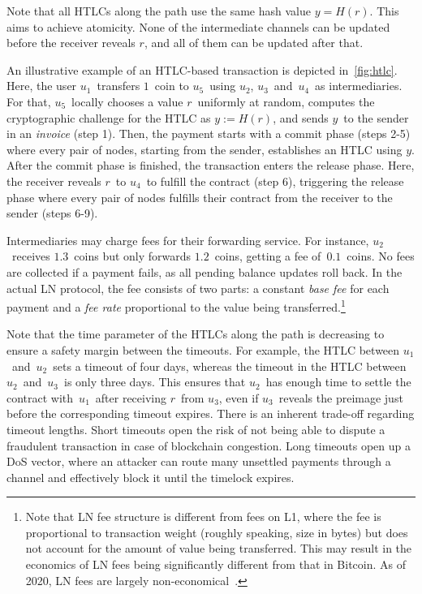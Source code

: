 Note that all HTLCs along the path use the same hash value $y=H(r)$.
This aims to achieve atomicity.
None of the intermediate channels can be updated before the receiver reveals $r$, and all of them can be updated after that.

An illustrative example of an HTLC-based transaction is depicted in~\cref{fig:htlc}.
Here, the user $u_1$~transfers $1$~coin to $u_5$~using $u_2$, $u_3$~and~$u_4$~as intermediaries.
For that, $u_5$~locally chooses a value $r$~uniformly at random, computes the cryptographic challenge for the HTLC as $y := H(r)$, and sends $y$~to the sender in an \textit{invoice} (step 1).
Then, the payment starts with a commit phase (steps 2-5) where every pair of nodes, starting from the sender, establishes an HTLC using $y$.
After the commit phase is finished, the transaction enters the release phase.
Here, the receiver reveals $r$~to $u_4$~to fulfill the contract (step 6), triggering the release phase where every pair of nodes fulfills their contract from the receiver to the sender (steps 6-9).

Intermediaries may charge fees for their forwarding service.
For instance, $u_2$~receives $1.3$~coins but only forwards $1.2$~coins, getting a fee of~$0.1$~coins.
No fees are collected if a payment fails, as all pending balance updates roll back.
In the actual LN protocol, the fee consists of two parts: a constant \textit{base fee} for each payment and a \textit{fee rate} proportional to the value being transferred.\footnote{Note that LN fee structure is different from fees on L1, where the fee is proportional to transaction weight (roughly speaking, size in bytes) but does not account for the amount of value being transferred. This may result in the economics of LN fees being significantly different from that in Bitcoin. As of 2020, LN fees are largely non-economical~\cite{Beres2019}.}

Note that the time parameter of the HTLCs along the path is decreasing to ensure a safety margin between the timeouts.
For example, the HTLC between $u_1$~and~$u_2$~sets a timeout of four days, whereas the timeout in the HTLC between $u_2$~and~$u_3$~is only three days.
This ensures that $u_2$~has enough time to settle the contract with~$u_1$~after receiving $r$~from $u_3$, even if $u_3$~reveals the preimage just before the corresponding timeout expires.
There is an inherent trade-off regarding timeout lengths.
Short timeouts open the risk of not being able to dispute a fraudulent transaction in case of blockchain congestion.
Long timeouts open up a DoS vector, where an attacker can route many unsettled payments through a channel and effectively block it until the timelock expires.

